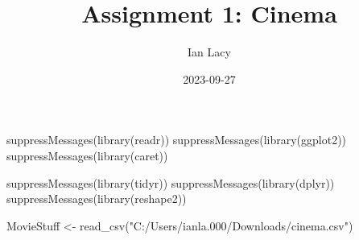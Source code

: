 \documentclass[
]{article}
\title{Assignment 1: Cinema}
\author{Ian Lacy}
\date{2023-09-27}
\newenvironment{Shaded}{\begin{snugshade}}{\end{snugshade}}
\newcommand{\FunctionTok}[1]{\textcolor[rgb]{0.00,0.00,0.00}{#1}}
\newcommand{\NormalTok}[1]{#1}
\newcommand{\OtherTok}[1]{\textcolor[rgb]{0.56,0.35,0.01}{#1}}
\newcommand{\StringTok}[1]{\textcolor[rgb]{0.31,0.60,0.02}{#1}}
\begin{document}
\maketitle

\begin{Shaded}
\begin{Highlighting}[]
\FunctionTok{suppressMessages}\NormalTok{(}\FunctionTok{library}\NormalTok{(readr))}
\FunctionTok{suppressMessages}\NormalTok{(}\FunctionTok{library}\NormalTok{(ggplot2))}
\FunctionTok{suppressMessages}\NormalTok{(}\FunctionTok{library}\NormalTok{(caret))}
\end{Highlighting}
\end{Shaded}

\begin{Shaded}
\begin{Highlighting}[]
\FunctionTok{suppressMessages}\NormalTok{(}\FunctionTok{library}\NormalTok{(tidyr))}
\FunctionTok{suppressMessages}\NormalTok{(}\FunctionTok{library}\NormalTok{(dplyr))}
\FunctionTok{suppressMessages}\NormalTok{(}\FunctionTok{library}\NormalTok{(reshape2))}
\end{Highlighting}
\end{Shaded}

\begin{Shaded}
\begin{Highlighting}[]
\NormalTok{MovieStuff }\OtherTok{\textless{}{-}} \FunctionTok{read\_csv}\NormalTok{(}\StringTok{"C:/Users/ianla.000/Downloads/cinema.csv"}\NormalTok{)}
\end{Highlighting}
\end{Shaded}
\end{document}
